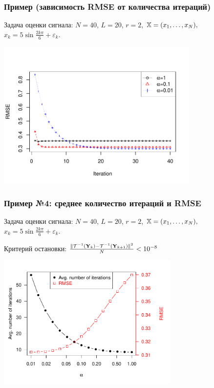 \documentclass[unicode, notheorems]{beamer}
\begin{document}
\begin{frame}
	\frametitle{Пример (зависимость RMSE от количества итераций)}
	Задача оценки сигнала: $N = 40$, $L = 20$, $r = 2$, $\mathbb{X} = (x_{1}, \ldots, x_N),$  $x_k = 5\sin{\frac{2 k \pi}{6}} + \varepsilon_k$.
	
	\vspace{-1cm}
	\begin{center}
		\includegraphics*[width = 10cm]{cadzowspeed_3.pdf}
	\end{center}
\end{frame}

\begin{frame}
	\frametitle{Пример №4: среднее количество итераций и RMSE}
	Задача оценки сигнала: $N = 40$, $L = 20$, $r = 2$, $\mathbb{X} = (x_{1}, \ldots, x_N),$  $x_k = 5\sin{\frac{2 k \pi}{6}} + \varepsilon_k$.
	
	Критерий остановки: $\frac{\|\mathcal{T}^{-1}(\mathbf{Y}_k) - \mathcal{T}^{-1}(\mathbf{Y}_{k + 1})\|^2}{N} < 10^{-8}$
	\vspace{-0.4cm}
	\begin{center}
		\includegraphics*[width = 9cm]{2axis.pdf} 
	\end{center}
\end{frame}
\end{document}

